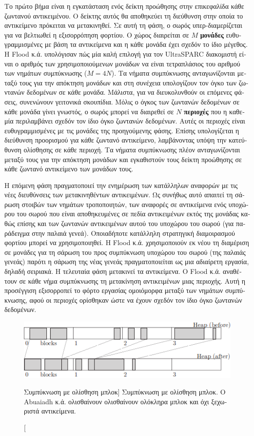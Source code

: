 \begin{greek}
Το πρώτο βήμα είναι η εγκατάσταση ενός δείκτη προώθησης στην
επικεφαλίδα κάθε ζωντανού αντικειμένου. Ο δείκτης αυτός θα
αποθηκεύει τη διεύθυνση στην οποία το αντικείμενο πρόκειται
να μετακινηθεί. Σε αυτή τη φάση, ο σωρός υπερ-διαμερίζεται
για να βελτιωθεί η εξισορρόπηση φορτίου. Ο χώρος διαιρείται
σε $M$ \textbf{μονάδες} ευθυγραμμισμένες με βάση τα αντικείμενα
και η κάθε μονάδα έχει σχεδόν το ίδιο μέγεθος. Η Flood κ.ά. υπολόγισαν
πώς μία καλή επιλογή για τον UltraSPARC διακομιστή είναι ο
αριθμός των χρησιμοποιούμενων μονάδων να είναι τετραπλάσιος
του αριθμού των νημάτων συμπύκνωσης ($M=4N$). Τα νήματα συμπύκνωσης
ανταγωνίζονται μεταξύ τους για την απόκτηση μονάδων και στη
συνέχεια υπολογίζουν τον όγκο των ζωντανών δεδομένων σε κάθε
μονάδα. Μάλιστα, για να διευκολυνθούν οι επόμενες φάσεις,
συνενώνουν γειτονικά σκουπίδια. Μόλις ο όγκος των ζωντανών
δεδομένων σε κάθε μονάδα γίνει γνωστός, ο σωρός μπορεί να 
διαιρεθεί σε $N$ \textbf{περιοχές} που η καθεμία περιλαμβάνει
σχεδόν τον ίδιο όγκο ζωντανών δεδομένων. Αυτές οι περιοχές
είναι ευθυγραμμισμένες με τις μονάδες της προηγούμενης φάσης.
Επίσης υπολογίζεται η διεύθυνση προορισμού για κάθε ζωντανό
αντικείμενο, λαμβάνοντας υπόψη την κατεύθυνση ολίσθησης σε
κάθε περιοχή. Τα νήματα συμπύκνωσης πλέον ανταγωνίζονται μεταξύ
τους για την απόκτηση μονάδων και εγκαθιστούν τους δείκτη προώθησης
σε κάθε ζωντανό αντικείμενο των μονάδων τους.

Η επόμενη φάση πραγματοποιεί την ενημέρωση των κατάλληλων αναφορών
με τις νέες διευθύνσεις των μετακινηθέντων αντικειμένων. Ως
συνήθως αυτό απαιτεί τη σάρωση στοιβών των νημάτων τροποποιητών,
των αναφορές σε αντικείμενα ενός υποχώρου του σωρού που είναι
αποθηκευμένες σε πεδία αντικειμένων εκτός της μονάδας καθώς
επίσης και των ζωντανών αντικειμένων αυτού του υποχώρου του
σωρού (για παράδειγμα στην παλαιά γενεά). Οποιαδήποτε κατάλληλη
στρατηγική διαμοιρασμού φορτίου μπορεί να χρησιμοποιηθεί. Η
Flood κ.ά. χρησιμοποιούν εκ νέου τη διαμέριση σε μονάδες για
τη σάρωση του προς συμπύκνωση υποχώρου του σωρού (της παλαιάς
γενεάς) παρότι η σάρωση της νέας γενεάς πραγματοποιείται ως
μια αδιαίρετη εργασία, δηλαδή σειριακά. Η τελευταία φάση μετακινεί
τα αντικείμενα. Ο Flood κ.ά. αναθέτουν σε κάθε νήμα συμπύκνωσης
τη μετακίνηση αντικειμένων μιας περιοχής. Αυτή η προσέγγιση
εξισορροπεί το φόρτο εργασίας ομοιόμορφα μεταξύ των νημάτων
συμπύκνωσης, αφού οι περιοχές ορίσθηκαν ώστε να έχουν σχεδόν
τον ίδιο όγκο ζωντανών δεδομένων.

\begin{figure}
  \centering
  \includegraphics{figures/par_6}
  \caption
    [Συμπύκνωση με ολίσθηση μπλοκ]
    {Συμπύκνωση με ολίσθηση μπλοκ. Ο Abuaiadh κ.ά. ολισθαίνουν
     ολισθαίνουν ολόκληρα μπλοκ και όχι ξεχωριστά αντικείμενα.}
  \label{fig:par_6}
\end{figure}


\end{greek}
